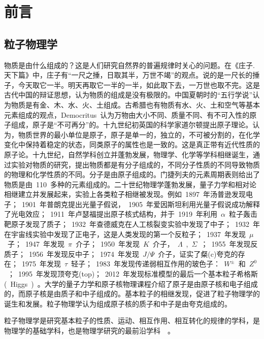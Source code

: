 \chapter{前言}

\section{粒子物理学}

物质是由什么组成的？这是人们研究自然界的普遍规律时关心的问题。在《庄子.天下篇》中，庄子有“一尺之捶，日取其半，万世不竭”的观点。说的是一尺长的捶子，今天取它一半。明天再取它一半的一半，如此取下去，一万世也取不完。这是古代中国的辩证思想，认为物质的组成是没有极限的。中国夏朝时的“五行学说”认为物质是有金、木、水、火、土组成。古希腊也有物质有水、火、土和空气等基本元素组成的观点，Democritus~认为万物由大小不同、质量不同、有不可入性的原子组成，原子是“不可再分”的。十九世纪初英国的科学家道尔顿提出原子理论。认为，物质世界的最小单位是原子，原子是单一的，独立的，不可被分割的，在化学变化中保持着稳定的状态，同类原子的属性也是一致的。这是真正带有近代性质的原子论。十九世纪，自然学科创立并蓬勃发展，物理学、化学等学科相继诞生，通过实验对物质的研究，提出物质都是有分子组成的，不同分子性质的不同导致物质的物理和化学性质的不同。分子是由原子组成的。门捷列夫的元素周期表则给出了物质是由~110~多种的元素组成的。二十世纪物理学蓬勃发展，量子力学和相对论相继建立并发展起来，实验上各类粒子相继被发现。例如~1897~年汤普逊发现电子；~1901~年普朗克提出光量子假说，~1905~年爱因斯坦利用光量子假说成功解释了光电效应；~1911~年卢瑟福提出原子核式结构，并于~1919~年利用~$\alpha$~粒子轰击靶原子发现了质子；~1932~年查德威克在人工核裂变实验中发现了中子；~1932~年在宇宙线实验中发现了正电子，这是人类发现的第一个反粒子；~1937~年发现~$\mu$~子；~1947~年发现~$\pi$~介子；~1950~年发现~$K$~介子，~$\Lambda$~,~$\Sigma$~；~1955~年发现反质子；~1956~年发现反中子；~1974~年发现~$J/\Psi$~介子，证实了粲(c)夸克的存在；~1975~年发现~$\tau$~轻子；~1983~年发现传递弱相互作用的玻色子：~$W^{\pm}$~和~$Z^{0}$~；~1995~年发现顶夸克(top)；~2012~年发现标准模型的最后一个基本粒子希格斯(~Higgs~)~\cite{ATLAS:2012}\cite{CMS:2012}。大学的量子力学和原子核物理课程介绍了原子是由原子核和电子组成的，而原子核是由质子和中子组成的。基本粒子的相继发现，促进了粒子物理学的诞生和发展。粒子物理学认为组成原子核的质子和中子是由夸克组成的。~\cite{2014lv}

粒子物理学是研究基本粒子的性质、运动、相互作用、相互转化的规律的学科，是物理学的基础学科，也是物理学研究的最前沿学科~\cite{zhangns2015}~\cite{duds2015}。

